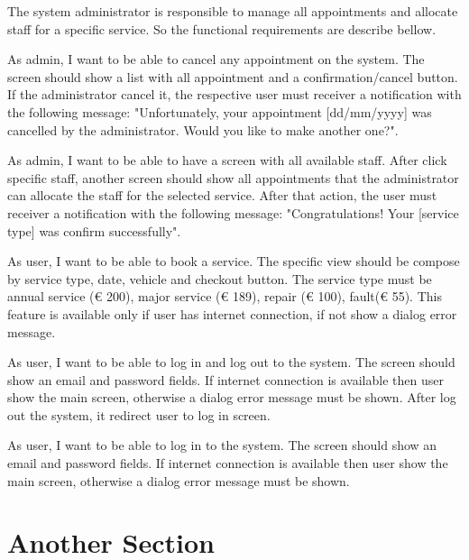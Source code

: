 The system administrator is responsible to manage all appointments and allocate staff for a specific service. So the functional requirements are describe bellow.

\begin{description}[font=$\bullet$~\normalfont\scshape\color{red!50!black}]

\item [Cancel appointment] As admin, I want to be able to cancel any appointment on the system. The screen should show a list with all appointment and a confirmation/cancel button. If the administrator cancel it, the respective user must receiver a notification with the following message: "Unfortunately, your appointment [dd/mm/yyyy] was cancelled by the administrator. Would you like to make another one?".

\item [Allocate staff for a service]As admin, I want to be able to have a screen with all available staff. After click specific staff, another screen should show all appointments that the administrator can allocate the staff for the selected service.  After that action, the user must receiver a notification with the following message: "Congratulations! Your [service type] was confirm successfully".

\item [Book service] As user, I want to be able to book a service. The specific view should be compose by service type, date, vehicle and checkout button. The service  type must be annual service (€ 200), major service (€ 189), repair (€ 100), fault(€ 55). This feature is available only if user has internet connection, if not show a dialog error message.

\item [Log in] As user, I want to be able to log in and log out to the system. The screen should  show an email and password fields. If internet connection is available then user show the main screen, otherwise a dialog error message must be shown. After log out the system, it redirect user to log in screen.

\item [Log in] As user, I want to be able to log in to the system. The screen should  show an email and password fields. If internet connection is available then user show the main screen, otherwise a dialog error message must be shown.

\end{description}

\section{Another Section}

